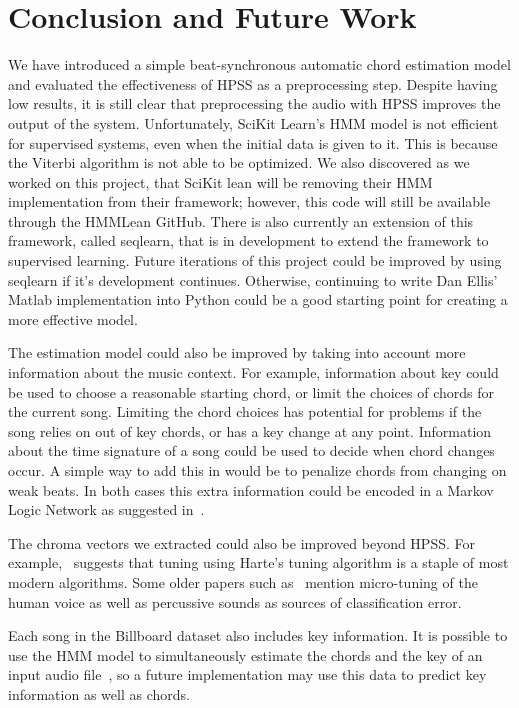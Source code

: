 \documentclass{article}
\begin{document}
\section{Conclusion and Future Work}

We have introduced a simple beat-synchronous automatic chord estimation model
and evaluated the effectiveness of HPSS as a preprocessing step. Despite having low
results, it is still clear that preprocessing the audio with HPSS improves the
output of the system. Unfortunately, SciKit Learn's HMM model is not efficient for
supervised systems, even when the initial data is given to it. This is because the
Viterbi algorithm is not able to be optimized. We also discovered as we worked
on this project, that SciKit lean will be removing their HMM implementation from
their framework; however, this code will still be available through the HMMLean GitHub.
There is also currently an extension of this framework, called seqlearn, that is in
development to extend the framework to supervised learning. Future iterations
of this project could be improved by using seqlearn if it's development continues.
Otherwise, continuing to write Dan Ellis' Matlab implementation into Python could
be a good starting point for creating a more effective model.

The estimation model could also be improved by taking into account more
information about the music context. For example, information about key could
be used to choose a reasonable starting chord, or limit the choices of chords
for the current song. Limiting the chord choices has potential for problems if
the song relies on out of key chords, or has a key change at any point.
Information about the time signature of a song could be used to decide when
chord changes occur. A simple way to add this in would be to penalize chords
from changing on weak beats. In both cases this extra information could be
encoded in a Markov Logic Network as suggested in~\cite{Papadopoulus:04}.

The chroma vectors we extracted could also be improved beyond HPSS\@. For
example,~\cite{McVicar:00} suggests that
tuning using Harte's tuning algorithm is a staple of most modern algorithms.
Some older papers such as~\cite{Zenz:20} mention micro-tuning of the human
voice as well as percussive sounds as sources of classification error.

Each song in the Billboard dataset also includes key information. It is
possible to use the HMM model to simultaneously estimate the chords and the key
of an input audio file~\cite{McVicar:00}, so a future implementation may use
this data to predict key information as well as chords.
\end{document}
